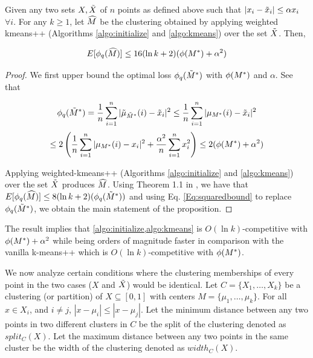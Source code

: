 \begin{proposition}\label{prop2}
Given any two sets $X, \tilde{X}$ of $n$ points as defined above such that $|x_i - \tilde{x}_{i}| \leq \alpha x_i$ $\forall i$. For any $k \geq 1$, let $\widehat{M}$ be the clustering obtained by applying weighted kmeans++ (Algorithms \ref{algo:initialize} and \ref{algo:kmeans}) over the set $\tilde{X}$. Then,

\begin{equation}
    E[\phi_q(\widehat{M})] \leq 16 (\ln k + 2) (\phi(M^{*}) + \alpha^2)
\end{equation}

\end{proposition}
\begin{proof}
    We first upper bound the optimal loss $\phi_q(\tilde{M}^{*})$ with $\phi(M^{*})$ and $\alpha$. See that

 \[
   \phi_q(\tilde{M}^{*}) =  \frac{1}{n} \sum_{i=1}^n |\tilde{\mu}_{\tilde{M}^{*}}(i) - \tilde{x}_{i}|^2  \leq \frac{1}{n} \sum_{i=1}^n |\mu_{M^{*}}(i) - \tilde{x}_{i}|^2
   \]
   \begin{equation}\label{Eq:squaredbound}
   \leq 2 \left ( \frac{1}{n}\sum_{i=1}^n |\mu_{M^{*}}(i) - x_i|^2 + \frac{\alpha^2}{n} \sum_{i=1}^n x_i^2 \right)  \leq 2(\phi(M^{*}) + \alpha^2)
   \end{equation}

   Applying weighted-kmeans++ (Algorithms \ref{algo:initialize} and \ref{algo:kmeans}) over the set $\tilde{X}$ produces $\widehat{M}$. Using Theorem 1.1 in \cite{kmeanspp}, we have that $E[\phi_q(\widehat{M})] \leq 8 (\ln k + 2) (\phi_q(\tilde{M}^{*}))$ and using Eq. \ref{Eq:squaredbound} to replace $\phi_q(\tilde{M}^{*})$, we obtain the main statement of the proposition.

\end{proof}

\begin{remark} The result implies that \cref{algo:initialize,algo:kmeans} is $O(\ln k)$-competitive with $\phi(M^{*}) + \alpha^2$ while being orders of magnitude faster in comparison with the vanilla k-means++ which is $O(\ln k)$-competitive with $\phi(M^{*})$.
\end{remark}



We now analyze certain conditions where the clustering memberships of every point in the two cases ($X$ and $\tilde{X}$) would be identical. Let $C = \{X_1, \ldots, X_k\}$ be a clustering (or partition) of $X \subseteq [0, 1]$ with centers $M = \{\mu_1, \ldots, \mu_k\}$. For all $x \in X_i$, and $i \neq j$, $|x - \mu_i| \leq |x - \mu_j|$. Let the minimum distance between any two points in two different clusters in $C$ be the split of the clustering denoted as $split_C(X)$. Let the maximum distance between any two points in the same cluster be the width of the clustering denoted as $width_C(X)$.

